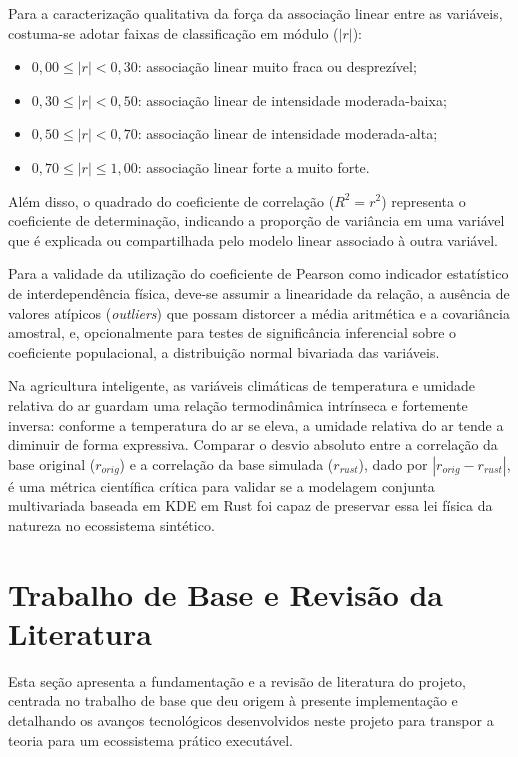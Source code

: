 \documentclass[
	12pt,
	openright,
	oneside,
	a4paper,
	english,
	brazil
	]{abntex2}
\begin{document}
Para a caracterização qualitativa da força da associação linear entre as variáveis, costuma-se adotar faixas de classificação em módulo ($|r|$):
\begin{itemize}
    \item $0,00 \leq |r| < 0,30$: associação linear muito fraca ou desprezível;
    \item $0,30 \leq |r| < 0,50$: associação linear de intensidade moderada-baixa;
    \item $0,50 \leq |r| < 0,70$: associação linear de intensidade moderada-alta;
    \item $0,70 \leq |r| \leq 1,00$: associação linear forte a muito forte.
\end{itemize}

Além disso, o quadrado do coeficiente de correlação ($R^2 = r^2$) representa o coeficiente de determinação, indicando a proporção de variância em uma variável que é explicada ou compartilhada pelo modelo linear associado à outra variável.

Para a validade da utilização do coeficiente de Pearson como indicador estatístico de interdependência física, deve-se assumir a linearidade da relação, a ausência de valores atípicos (\textit{outliers}) que possam distorcer a média aritmética e a covariância amostral, e, opcionalmente para testes de significância inferencial sobre o coeficiente populacional, a distribuição normal bivariada das variáveis.

Na agricultura inteligente, as variáveis climáticas de temperatura e umidade relativa do ar guardam uma relação termodinâmica intrínseca e fortemente inversa: conforme a temperatura do ar se eleva, a umidade relativa do ar tende a diminuir de forma expressiva. Comparar o desvio absoluto entre a correlação da base original ($r_{orig}$) e a correlação da base simulada ($r_{rust}$), dado por $|r_{orig} - r_{rust}|$, é uma métrica científica crítica para validar se a modelagem conjunta multivariada baseada em KDE em Rust foi capaz de preservar essa lei física da natureza no ecossistema sintético.

\section{Trabalho de Base e Revisão da Literatura}
\label{sec:trabalho_base}

Esta seção apresenta a fundamentação e a revisão de literatura do projeto, centrada no trabalho de base que deu origem à presente implementação e detalhando os avanços tecnológicos desenvolvidos neste projeto para transpor a teoria para um ecossistema prático executável.
\end{document}
